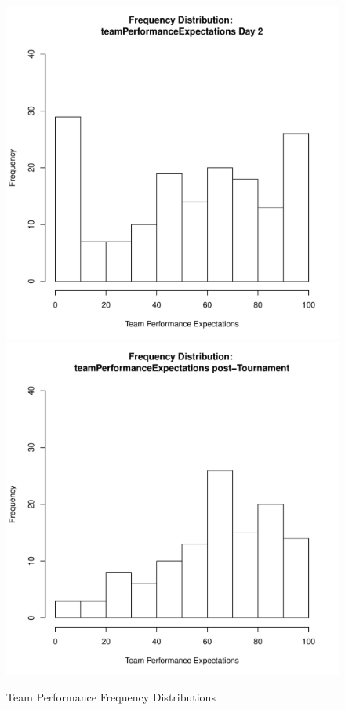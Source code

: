 \documentclass[12pt]{report}
\begin{document}
{\begin{figure}[htbp]
  \includegraphics[scale =.4]{../images/distTeamPerfExpDay2.pdf}
  \includegraphics[scale =.4]{../images/distTeamPerfExpPost.pdf}
  \caption{Team Performance Frequency Distributions}
  \label{fig:teamPerformanceDist}
\end{figure}

}
\end{document}

